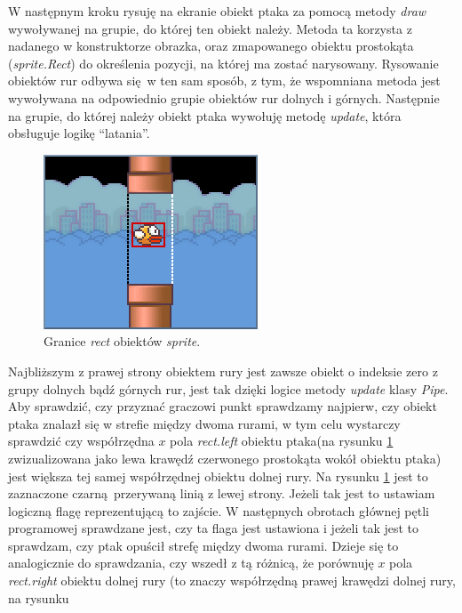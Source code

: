 \documentclass[a4paper, 12pt,oneside]{book}
\begin{document}
W następnym kroku rysuję na ekranie obiekt ptaka za pomocą metody \textit{draw}
wywoływanej na grupie, do której ten obiekt należy. Metoda ta korzysta z
nadanego w konstruktorze obrazka, oraz zmapowanego obiektu prostokąta
(\textit{sprite.Rect}) do określenia pozycji, na której ma zostać
narysowany\cite{pygame_group_draw_documentation}. Rysowanie obiektów rur odbywa
się w ten sam sposób, z tym, że wspomniana metoda jest wywoływana na
odpowiednio grupie obiektów rur dolnych i górnych. Następnie na grupie, do
której należy obiekt ptaka wywołuję metodę \textit{update}, która obsługuje
logikę ``latania''.

\begin{figure} 
	\begin{center}
		\includegraphics[scale=1.10]{flappy_scoring.png}
		\caption{Granice \textit{rect} obiektów \textit{sprite}.}
		\label{flappy_scoring_fig}
	\end{center}
\end{figure}
Najbliższym z prawej strony obiektem rury jest zawsze obiekt o indeksie zero
z grupy dolnych bądź górnych rur, jest tak dzięki logice metody \textit{update}
klasy \textit{Pipe}. Aby sprawdzić, czy przyznać graczowi punkt sprawdzamy
najpierw, czy obiekt ptaka znalazł się w strefie między dwoma rurami, w tym
celu wystarczy sprawdzić czy współrzędna $x$ pola \textit{rect.left} obiektu
ptaka(na rysunku \ref{flappy_scoring_fig} zwizualizowana jako lewa krawędź
czerwonego prostokąta wokół obiektu ptaka) jest większa tej samej współrzędnej
obiektu dolnej rury. Na rysunku \ref{flappy_scoring_fig} jest to zaznaczone
czarną przerywaną linią z lewej strony. Jeżeli tak jest to ustawiam logiczną
flagę reprezentującą to zajście.
W następnych obrotach głównej pętli programowej sprawdzane jest, czy ta flaga
jest ustawiona i jeżeli tak jest to sprawdzam, czy ptak opuścił strefę między
dwoma rurami. Dzieje się to analogicznie do sprawdzania, czy wszedł z tą
różnicą, że porównuję $x$ pola \textit{rect.right} obiektu dolnej rury (to
znaczy współrzędną prawej krawędzi dolnej rury, na rysunku
\end{document}
